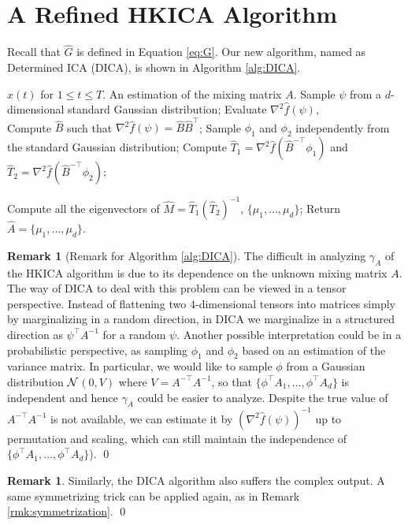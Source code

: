 \documentclass[twoside]{article}
\newcommand{\cN}{\cal{N}}
\theoremstyle{definition}
\newtheorem{remark}[lemma]{Remark}
\begin{document}
\section{A Refined HKICA Algorithm}
\label{sec:DICA}
Recall that $\widehat{G}$ is defined in Equation \eqref{eq:G}.
Our new algorithm, named as Determined ICA (DICA), is shown in Algorithm \ref{alg:DICA}. 
\begin{algorithm}
\caption{Determined ICA (DICA)}
\label{alg:DICA}
\begin{algorithmic}[1]
\INPUT $x(t)$ for $1\le t \le T$. 
\OUTPUT An estimation of the mixing matrix $A$. 
\STATE Sample $\psi$ from a $d$-dimensional standard Gaussian distribution;
\STATE Evaluate $\nabla^2\widehat{f}(\psi)$, \\
\STATE Compute $\widehat{B}$ such that $\nabla^2\widehat{f}(\psi) = \widehat{B}\widehat{B}^{\top}$;
\STATE Sample $\phi_1$ and $\phi_2$ independently from the standard Gaussian distribution;
\STATE Compute $\widehat{T}_1 =\nabla^2\widehat{f}(\widehat{B}^{-\top}\phi_1)$ and  $\widehat{T}_2 =\nabla^2\widehat{f}(\widehat{B}^{-\top}\phi_2)$;

\STATE Compute all the eigenvectors of $\widehat{M} = \widehat{T}_1\left(\widehat{T}_2\right)^{-1}$, $\{\mu_1,\ldots,\mu_d\}$;
\STATE Return $\widehat{A} = \{\mu_1,\ldots,\mu_d\}$.
\end{algorithmic}
\end{algorithm}
\begin{remark}[Remark for Algorithm \ref{alg:DICA}]
The difficult in analyzing $\gamma_A$ of the HKICA algorithm is due to its dependence on the unknown mixing matrix $A$. 
The way of DICA to deal with this problem can be viewed in a tensor perspective. 
Instead of flattening two $4$-dimensional tensors into matrices simply by marginalizing in a random direction, in DICA we marginalize in a structured direction as $\psi^{\top}A^{-1}$ for a random $\psi$. 
Another possible interpretation could be in a  probabilistic perspective, as sampling $\phi_1$ and $\phi_2$ based on an estimation of the variance matrix. 
In particular, we would like to sample $\phi$ from a Gaussian distribution $\cN$$(0,V)$ where $V = A^{-\top}A^{-1}$, so that $\{\phi^{\top}A_1, \ldots, \phi^{\top}A_d \}$ is independent and hence $\gamma_A$ could be easier to analyze. 
Despite the true value of $A^{-\top}A^{-1}$ is not available, we can estimate it by $\left(\nabla^2\widehat{f}(\psi)\right)^{-1}$ up to permutation and scaling,
which can still maintain the independence of $\{\phi^{\top}A_1, \ldots, \phi^{\top}A_d \}$). 
\qed
\end{remark}
\begin{remark}
Similarly, the DICA algorithm also suffers the complex output. 
A same symmetrizing trick can be applied again, as in Remark \ref{rmk:symmetrization}. \qed 
\end{remark}
\end{document}
